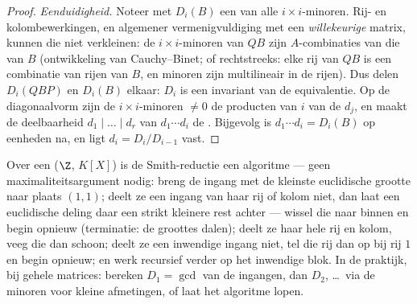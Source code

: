 \begin{proof}
\emph{Eenduidigheid.} Noteer met $D_i(B)$ een 
van alle $i \times i$-minoren. Rij- en kolombewerkingen, en
algemener vermenigvuldiging met een \emph{willekeurige} matrix,
kunnen die  niet verkleinen: de $i \times
i$-minoren van $QB$ zijn $A$-combinaties van die van $B$
(ontwikkeling van Cauchy--Binet; of rechtstreeks: elke rij van $QB$
is een combinatie van rijen van $B$, en minoren zijn multilineair
in de rijen). Dus delen $D_i(QBP)$ en $D_i(B)$ elkaar: $D_i$ is een
invariant van de equivalentie. Op de diagonaalvorm zijn de $i
\times i$-minoren $\neq 0$ de producten van $i$ van de $d_j$, en
maakt de deelbaarheid $d_1 \mid \dots \mid d_r$ van $d_1 \cdots
d_i$ de . Bijgevolg is $d_1 \cdots d_i =
D_i(B)$ op eenheden na, en ligt $d_i = D_i/D_{i-1}$ vast.
\end{proof}

\begin{method}\label{met:b3:modules:smith}
Over een  ($\Z$, $K[X]$) is de Smith-reductie een
algoritme --- geen maximaliteitsargument nodig: breng de ingang met
de kleinste euclidische grootte naar plaats $(1,1)$; deelt ze een
ingang van haar rij of kolom niet, dan laat een euclidische deling
daar een strikt kleinere rest achter --- wissel die naar binnen en
begin opnieuw (terminatie: de groottes dalen); deelt ze haar hele
rij en kolom, veeg die dan schoon; deelt ze een inwendige ingang
niet, tel die rij dan op bij rij $1$ en begin opnieuw; en werk
recursief verder op het inwendige blok. In de praktijk, bij gehele
matrices: bereken $D_1 = \gcd$ van de ingangen, dan $D_2$, \dots\
via de minoren voor kleine afmetingen, of laat het algoritme
lopen.
\end{method}


